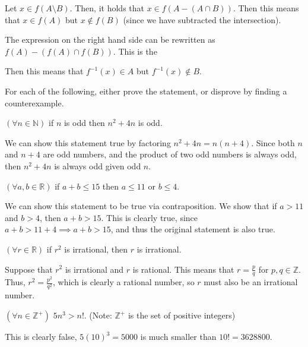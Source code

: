 \documentclass[11pt]{article}
\begin{document}
\begin{Parts}
    \begin{solution}
        Let $x \in f(A \setminus B)$. Then, it holds that $x \in f(A - (A \cap B))$. Then this means that $x \in f(A)$ but $x \notin f(B)$ (since we have subtracted the intersection). 

        The expression on the right hand side can be rewritten as $f(A) - (f(A) \cap f(B))$. This is the 
        
        Then this means that $f^{-1}(x) \in A$ but $f^{-1}(x) \notin B$. 
    \end{solution}
\end{Parts}

For each of the following, either prove the statement, or disprove by finding a counterexample.
\begin{Parts}
	\Part $(\forall n \in \mathbb{N})$ if $n$ is odd then $n^2 + 4n$ is odd.

    \begin{solution}
        We can show this statement true by factoring $n^2 + 4n = n(n+4)$. Since both $n$ and $n + 4$ are odd numbers, and the product of two odd numbers is always odd, then $n^2 + 4n$ is always odd given odd $n$.
    \end{solution}

	\Part $(\forall a, b \in \mathbb{R})$ if $a + b \le 15$ then $a \le 11$ or $b \le 4$.

    \begin{solution}
        We can show this statement to be true via contraposition. We show that if $a > 11$ and $b > 4$, then $a + b > 15$. This is clearly true, since $a + b > 11 + 4 \implies a + b > 15$, and thus the original statement is also true.
    \end{solution}


	\Part $(\forall r \in \mathbb{R})$ if $r^2$ is irrational, then $r$ is irrational.

\begin{solution}
    Suppose that $r^2$ is irrational and $r$ is rational. This means that $r =\frac{p}{q}$ for $p, q \in \mathbb Z$. Thus, $r^2 = \frac{p^2}{q^2}$, which is clearly a rational number, so $r$ must also be an irrational number.
\end{solution} 


	\Part $(\forall n \in \mathbb{Z}^+)$ $5n^3 > n!$. (Note: $\mathbb{Z}^+$ is the set of positive integers)

    \begin{solution}
    This is clearly false, $5(10)^3 = 5000$ is much smaller than $10! = 3628800$.
    \end{solution}
\end{Parts}
\end{document}
